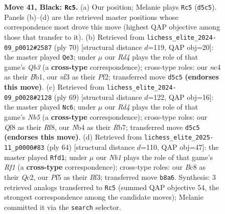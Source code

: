 \documentclass[11pt]{article}
\begin{document}
\begin{figure}[p]
\caption{\textbf{Move 41, Black: \texttt{Rc5}.} (a) Our position; Melanie plays \texttt{Rc5} (\texttt{d5c5}). Panels (b)--(d) are the retrieved master positions whose correspondence most drove this move (highest QAP objective among those that transfer to it). (b) Retrieved from \texttt{lichess\_elite\_2024-09\_p0012\#2587} (ply 70) [structural distance $d$=119, QAP obj=20]: the master played \texttt{Qe3}; under $\mu$ our \emph{Rd4} plays the role of that game's \emph{Qb3} (a \textbf{cross-type} correspondence); cross-type roles: our \emph{n}c4 as their \emph{B}b1, our \emph{n}f3 as their \emph{P}f2; transferred move \texttt{d5c5} \textbf{(endorses this move)}. (c) Retrieved from \texttt{lichess\_elite\_2024-09\_p0028\#2128} (ply 69) [structural distance $d$=122, QAP obj=16]: the master played \texttt{Nc6}; under $\mu$ our \emph{Rd4} plays the role of that game's \emph{Nb5} (a \textbf{cross-type} correspondence); cross-type roles: our \emph{Q}f8 as their \emph{R}f8, our \emph{N}b4 as their \emph{R}b7; transferred move \texttt{d5c5} \textbf{(endorses this move)}. (d) Retrieved from \texttt{lichess\_elite\_2025-11\_p0000\#83} (ply 64) [structural distance $d$=110, QAP obj=47]: the master played \texttt{Rfd1}; under $\mu$ our \emph{Nb1} plays the role of that game's \emph{Rf1} (a \textbf{cross-type} correspondence); cross-type roles: our \emph{B}c8 as their \emph{Q}c2, our \emph{P}f5 as their \emph{B}f3; transferred move \texttt{b8a6}. Synthesis: 3 retrieved analogs transferred to \texttt{Rc5} (summed QAP objective 54, the strongest correspondence among the candidate moves); Melanie committed it via the \texttt{search} selector.}
\label{fig:thought-m81}
\end{figure}

\clearpage
\end{document}
